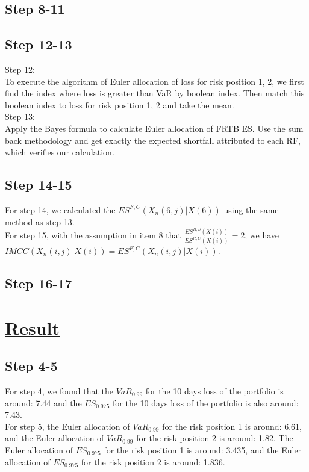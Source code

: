 \documentclass{article}
\begin{document}
\subsection*{Step 8-11}
\subsection*{Step 12-13}
Step 12:\\
To execute the algorithm of Euler allocation of loss for risk position 1, 2, we first find the index where loss is greater than VaR by boolean index. Then match this boolean index to loss for risk position 1, 2 and take the mean.
\\Step 13:\\
Apply the Bayes formula to calculate Euler allocation of FRTB ES.
Use the sum back methodology and get exactly the expected shortfall attributed to each RF, which verifies our calculation.

\subsection*{Step 14-15}
For step 14, we calculated the $ES^{F,C}(X_n(6,j)|X(6))$ using the same method as step 13.
\\For step 15, with the assumption in item 8 that $\frac {ES^{R,S}(X(i))} {ES^{R,C}(X(i))} = 2$, we have $IMCC(X_n(i,j)|X(i))=ES^{F,C}(X_n(i,j)|X(i))$.
\subsection*{Step 16-17}
\section*{\underline{Result}}

\subsection*{Step 4-5}
For step 4, we found that the $VaR_{0.99}$ for the 10 days loss of the portfolio is around: 7.44 and the $ES_{0.975}$ for the 10 days loss of the portfolio is also around: 7.43.
\\For step 5, the Euler allocation of $VaR_{0.99}$ for the risk position 1 is around: 6.61, and the Euler allocation of $VaR_{0.99}$ for the risk position 2 is around: 1.82. The Euler allocation of $ES_{0.975}$ for the risk position 1 is around: 3.435, and the Euler allocation of $ES_{0.975}$ for the risk position 2 is around: 1.836.
\end{document}
